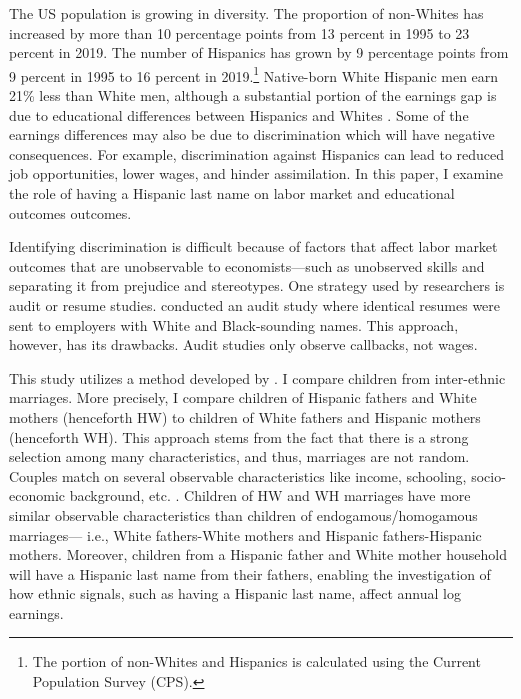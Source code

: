 \documentclass[a4paper,fleqn]{cas-sc}
\begin{document}
The US population is growing in diversity. The proportion of non-Whites has increased by more than 10 percentage points from 13 percent in 1995 to 23 percent in 2019. The number of Hispanics has grown by 9 percentage points from 9 percent in 1995 to 16 percent in 2019.\footnote{The portion of non-Whites and Hispanics is calculated using the Current Population Survey (CPS).} Native-born White Hispanic men earn 21\% less than White men, although a substantial portion of the earnings gap is due to educational differences between Hispanics and Whites \citep{duncan2006hispanics, duncan2018identifying, duncan2018socioeconomic}. Some of the earnings differences may also be due to discrimination which will have negative consequences. For example, discrimination against Hispanics can lead to reduced job opportunities, lower wages, and hinder assimilation. In this paper, I examine the role of having a Hispanic last name on labor market and educational outcomes outcomes. 

Identifying discrimination is difficult because of factors that affect labor market outcomes that are unobservable to economists---such as unobserved skills and separating it from prejudice and stereotypes. One strategy used by researchers is audit or resume studies. \citet{bertrand2004emily} conducted an audit study where identical resumes were sent to employers with White and Black-sounding names. This approach, however, has its drawbacks. Audit studies only observe callbacks, not wages. 

This study utilizes a method developed by \citet{rubinstein2014pride}. I compare children from inter-ethnic marriages. More precisely, I compare children of Hispanic fathers and White mothers (henceforth HW) to children of White fathers and Hispanic mothers (henceforth  WH). This approach stems from the fact that there is a strong selection among many characteristics, and thus, marriages are not random. Couples match on several observable characteristics like income, schooling, socio-economic background, etc. \citep{averettBetterWorseRelationship2008, averettEconomicRealityBeauty1996, beckerTheoryMarriagePart1973, beckerTheoryMarriagePart1974, beckerTreatiseFamily1993, browningCollectiveUnitaryModels2006, chiapporiFatterAttractionAnthropometric2012}. Children of HW and WH marriages have more similar observable characteristics than children of endogamous/homogamous marriages--- i.e., White fathers-White mothers and Hispanic fathers-Hispanic mothers. Moreover, children from a Hispanic father and White mother household will have a Hispanic last name from their fathers, enabling the investigation of how ethnic signals, such as having a Hispanic last name, affect annual log earnings.
\end{document}
